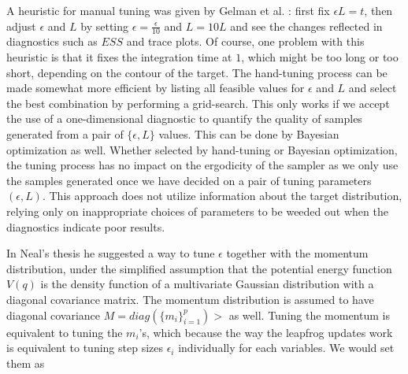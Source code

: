 \documentclass[12pt]{report}
\begin{document}
A heuristic for manual tuning was given by Gelman et al.
\cite{gelman2014bayesian}: first fix $\epsilon L = t$, then adjust $\epsilon$
and $L$ by setting $\epsilon = \frac{\epsilon}{10} $ and $L = 10L$ and see the
changes reflected in diagnostics such as $ESS$ and trace plots. Of course, one
problem with this heuristic is that it fixes the integration time at $1$, which
might be too long or too short, depending on the contour of the target. The hand-tuning process can be made somewhat more efficient by listing all feasible values
for $\epsilon$ and $L$ and select the best combination by performing a grid-search. This only works if we accept
the use of a one-dimensional diagnostic to quantify the quality of samples
generated from a pair of $\{\epsilon,L\}$ values. This can be done by Bayesian
optimization as well. Whether selected by hand-tuning or Bayesian optimization,
the tuning process has no impact on the ergodicity of the sampler as we only
use the samples generated once we have decided on a pair of tuning parameters
$(\epsilon,L)$. This approach does not utilize information about the target
distribution, relying only on inappropriate choices of parameters to be weeded
out when the diagnostics indicate poor results.

In Neal's thesis \cite{neal1996sampling} he suggested a way to tune $\epsilon$ together with the
momentum distribution,  under the simplified assumption that the potential
energy function $V(q)$ is the density function of a multivariate Gaussian distribution
with a diagonal
covariance matrix. The momentum distribution is assumed to have diagonal
covariance $M= diag(\{m_i\}_{i=1}^p)>$ as well. Tuning the momentum is
equivalent to tuning the $m_i$'s, which because the way the leapfrog updates
work is equivalent to tuning step sizes $\epsilon_i$ individually for each
variables. We would set them as
\end{document}
